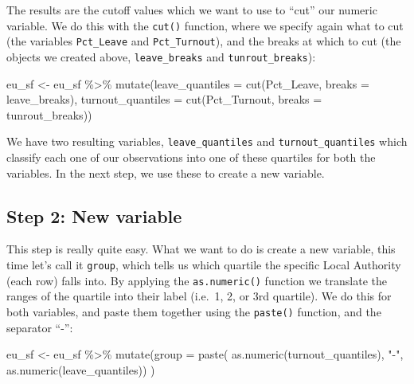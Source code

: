 \documentclass[
]{book}
\makeatletter
\newenvironment{Shaded}{\begin{snugshade}}{\end{snugshade}}
\newcommand{\AttributeTok}[1]{\textcolor[rgb]{0.61,0.61,0.61}{#1}}
\newcommand{\FunctionTok}[1]{\textcolor[rgb]{0,0,0}{#1}}
\newcommand{\NormalTok}[1]{#1}
\newcommand{\OtherTok}[1]{\textcolor[rgb]{0.37,0.37,0.37}{#1}}
\newcommand{\SpecialCharTok}[1]{\textcolor[rgb]{0,0,0}{#1}}
\newcommand{\StringTok}[1]{\textcolor[rgb]{0.5,0.5,0.5}{#1}}
\newenvironment{kframe}{%
\medskip{}
\setlength{\fboxsep}{.8em}
 \def\at@end@of@kframe{}%
 \ifinner\ifhmode%
  \def\at@end@of@kframe{\end{minipage}}%
  \begin{minipage}{\columnwidth}%
 \fi\fi%
 \def\FrameCommand##1{\hskip\@totalleftmargin \hskip-\fboxsep
 \colorbox{shadecolor}{##1}\hskip-\fboxsep
     \hskip-\linewidth \hskip-\@totalleftmargin \hskip\columnwidth}%
 \MakeFramed {\advance\hsize-\width
   \@totalleftmargin\z@ \linewidth\hsize
   \@setminipage}}%
 {\par\unskip\endMakeFramed%
 \at@end@of@kframe}
\renewenvironment{Shaded}{\begin{kframe}}{\end{kframe}}
\makeatother
\begin{document}
The results are the cutoff values which we want to use to ``cut'' our numeric variable. We do this with the \texttt{cut()} function, where we specify again what to cut (the variables \texttt{Pct\_Leave} and \texttt{Pct\_Turnout}), and the breaks at which to cut (the objects we created above, \texttt{leave\_breaks} and \texttt{tunrout\_breaks}):

\begin{Shaded}
\begin{Highlighting}[]
\NormalTok{eu\_sf }\OtherTok{\textless{}{-}}\NormalTok{ eu\_sf }\SpecialCharTok{\%\textgreater{}\%} 
  \FunctionTok{mutate}\NormalTok{(}\AttributeTok{leave\_quantiles =} \FunctionTok{cut}\NormalTok{(Pct\_Leave, }
                               \AttributeTok{breaks =}\NormalTok{ leave\_breaks), }
         \AttributeTok{turnout\_quantiles =} \FunctionTok{cut}\NormalTok{(Pct\_Turnout, }
                                 \AttributeTok{breaks =}\NormalTok{ tunrout\_breaks))}
\end{Highlighting}
\end{Shaded}

We have two resulting variables, \texttt{leave\_quantiles} and \texttt{turnout\_quantiles} which classify each one of our observations into one of these quartiles for both the variables. In the next step, we use these to create a new variable.

\hypertarget{step-2-new-variable}{%
\subsection{Step 2: New variable}\label{step-2-new-variable}}

This step is really quite easy. What we want to do is create a new variable, this time let's call it \texttt{group}, which tells us which quartile the specific Local Authority (each row) falls into. By applying the \texttt{as.numeric()} function we translate the ranges of the quartile into their label (i.e.~1, 2, or 3rd quartile). We do this for both variables, and paste them together using the \texttt{paste()} function, and the separator ``-'':

\begin{Shaded}
\begin{Highlighting}[]
\NormalTok{eu\_sf }\OtherTok{\textless{}{-}}\NormalTok{ eu\_sf }\SpecialCharTok{\%\textgreater{}\%} 
  \FunctionTok{mutate}\NormalTok{(}\AttributeTok{group =} \FunctionTok{paste}\NormalTok{(}
      \FunctionTok{as.numeric}\NormalTok{(turnout\_quantiles), }\StringTok{"{-}"}\NormalTok{,}
      \FunctionTok{as.numeric}\NormalTok{(leave\_quantiles))}
\NormalTok{    )}
\end{Highlighting}
\end{Shaded}
\end{document}
